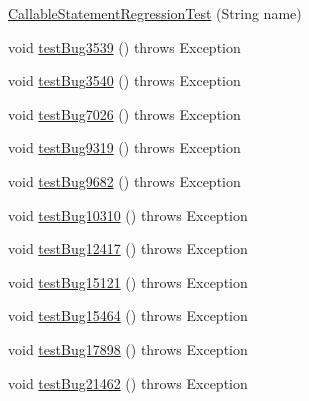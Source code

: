 \begin{DoxyCompactItemize}
\item 
\mbox{\hyperlink{classtestsuite_1_1regression_1_1_callable_statement_regression_test_af9ef106e44b57c0840c422e64fb25fe7}{Callable\+Statement\+Regression\+Test}} (String name)
\item 
void \mbox{\hyperlink{classtestsuite_1_1regression_1_1_callable_statement_regression_test_a6c39c2788d35a24b2933541c30b8738d}{test\+Bug3539}} ()  throws Exception 
\item 
void \mbox{\hyperlink{classtestsuite_1_1regression_1_1_callable_statement_regression_test_a060bce79977b8f767964814bd7f23f80}{test\+Bug3540}} ()  throws Exception 
\item 
void \mbox{\hyperlink{classtestsuite_1_1regression_1_1_callable_statement_regression_test_a7bf5345327e03c1c948299a62ca552c7}{test\+Bug7026}} ()  throws Exception 
\item 
void \mbox{\hyperlink{classtestsuite_1_1regression_1_1_callable_statement_regression_test_aeeca9a21c07d1325e181cbd40bef0199}{test\+Bug9319}} ()  throws Exception 
\item 
void \mbox{\hyperlink{classtestsuite_1_1regression_1_1_callable_statement_regression_test_aa84b6f7f456f3d576c6d8c22213a24b2}{test\+Bug9682}} ()  throws Exception 
\item 
void \mbox{\hyperlink{classtestsuite_1_1regression_1_1_callable_statement_regression_test_a8cd92a05056f0d180cf2d2f9f68bea36}{test\+Bug10310}} ()  throws Exception 
\item 
void \mbox{\hyperlink{classtestsuite_1_1regression_1_1_callable_statement_regression_test_a94871dee0acb2b3df8de40559b08d32d}{test\+Bug12417}} ()  throws Exception 
\item 
void \mbox{\hyperlink{classtestsuite_1_1regression_1_1_callable_statement_regression_test_a8378792de361d7a282b26a61c3b2f8a9}{test\+Bug15121}} ()  throws Exception 
\item 
void \mbox{\hyperlink{classtestsuite_1_1regression_1_1_callable_statement_regression_test_a5448d02b9a24375eb4b2d175d273c20f}{test\+Bug15464}} ()  throws Exception 
\item 
void \mbox{\hyperlink{classtestsuite_1_1regression_1_1_callable_statement_regression_test_a32278d6baf7013d850879cfd634b38cc}{test\+Bug17898}} ()  throws Exception 
\item 
void \mbox{\hyperlink{classtestsuite_1_1regression_1_1_callable_statement_regression_test_abb265c7a921933c8ecde8c1c12441513}{test\+Bug21462}} ()  throws Exception 

\end{DoxyCompactItemize}
